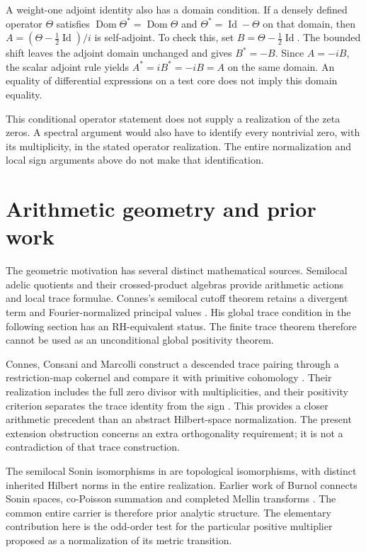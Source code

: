 \documentclass[11pt,letterpaper]{article}
\theoremstyle{definition}
\theoremstyle{remark}
\newcommand{\Id}{\operatorname{Id}}
\newcommand{\Dom}{\operatorname{Dom}}
\begin{document}
A weight-one adjoint identity also has a domain condition.
If a densely defined operator $\Theta$ satisfies
$\Dom\Theta^*=\Dom\Theta$ and
$\Theta^*=\Id-\Theta$ on that domain, then
$A=(\Theta-\frac12\Id)/i$ is self-adjoint.
To check this, set $B=\Theta-\frac12\Id$. The bounded
shift leaves the adjoint domain unchanged and gives
$B^*=-B$. Since $A=-iB$, the scalar adjoint rule yields
$A^*=iB^*=-iB=A$ on the same domain.
An equality of differential expressions on a test core
does not imply this domain equality.

This conditional operator statement does not supply a
realization of the zeta zeros. A spectral argument would
also have to identify every nontrivial zero, with its
multiplicity, in the stated operator realization. The
entire normalization and local sign arguments above do
not make that identification.

\section{Arithmetic geometry and prior work}
\label{sec:prior}

The geometric motivation has several distinct mathematical
sources. Semilocal adelic quotients and their crossed-product
algebras provide arithmetic actions and local trace formulae.
Connes's semilocal cutoff theorem retains a divergent term
and Fourier-normalized principal values
\cite[Section VII, Theorem 4]{C98}. His global trace condition
in the following section has an RH-equivalent status.
The finite trace theorem therefore cannot be used as an
unconditional global positivity theorem.

Connes, Consani and Marcolli construct a descended trace
pairing through a restriction-map cokernel and compare it
with primitive cohomology
\cite[Sections 4.2 to 5]{CCM07}. Their realization includes
the full zero divisor with multiplicities, and their
positivity criterion separates the trace identity from
the sign \cite[Theorem 6.1 and Proposition 6.2]{CCM07}.
This provides a closer arithmetic precedent than an
abstract Hilbert-space normalization. The present extension
obstruction concerns an extra orthogonality requirement;
it is not a contradiction of that trace construction.

The semilocal Sonin isomorphisms in \cite[Theorem 4.6]{CCM24}
are topological isomorphisms, with distinct inherited
Hilbert norms in the entire realization. Earlier work of
Burnol connects Sonin spaces, co-Poisson summation and
completed Mellin transforms
\cite[Introduction and Section 2]{B04}.
The common entire carrier is therefore prior analytic
structure. The elementary contribution here is the
odd-order test for the particular positive multiplier
proposed as a normalization of its metric transition.
\end{document}
